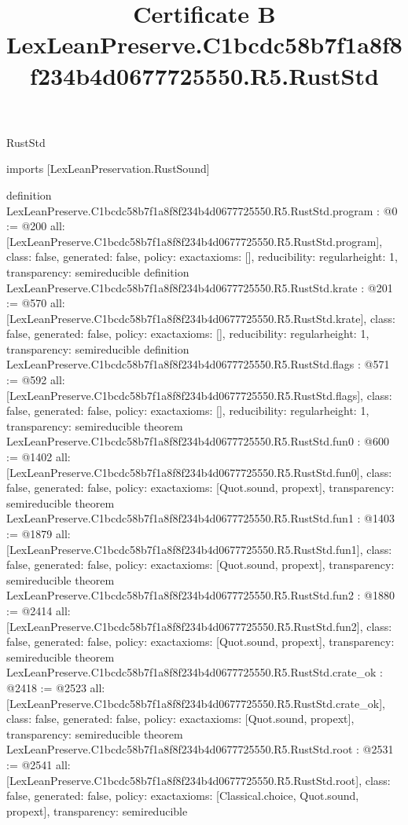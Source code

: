\begin{lexlean}{RustStd}
\title{Certificate B LexLeanPreserve.C1bcdc58b7f1a8f8f234b4d0677725550.R5.RustStd}
\begin{coremodule}
imports [LexLeanPreservation.RustSound]

definition LexLeanPreserve.C1bcdc58b7f1a8f8f234b4d0677725550.R5.RustStd.program : @0 := @200 {
  all: [LexLeanPreserve.C1bcdc58b7f1a8f8f234b4d0677725550.R5.RustStd.program],
  class: false,
  generated: false,
  policy: exact{axioms: []},
  reducibility: regular{height: 1},
  transparency: semireducible
}
definition LexLeanPreserve.C1bcdc58b7f1a8f8f234b4d0677725550.R5.RustStd.krate : @201 := @570 {
  all: [LexLeanPreserve.C1bcdc58b7f1a8f8f234b4d0677725550.R5.RustStd.krate],
  class: false,
  generated: false,
  policy: exact{axioms: []},
  reducibility: regular{height: 1},
  transparency: semireducible
}
definition LexLeanPreserve.C1bcdc58b7f1a8f8f234b4d0677725550.R5.RustStd.flags : @571 := @592 {
  all: [LexLeanPreserve.C1bcdc58b7f1a8f8f234b4d0677725550.R5.RustStd.flags],
  class: false,
  generated: false,
  policy: exact{axioms: []},
  reducibility: regular{height: 1},
  transparency: semireducible
}
theorem LexLeanPreserve.C1bcdc58b7f1a8f8f234b4d0677725550.R5.RustStd.fun0 : @600 := @1402 {
  all: [LexLeanPreserve.C1bcdc58b7f1a8f8f234b4d0677725550.R5.RustStd.fun0],
  class: false,
  generated: false,
  policy: exact{axioms: [Quot.sound, propext]},
  transparency: semireducible
}
theorem LexLeanPreserve.C1bcdc58b7f1a8f8f234b4d0677725550.R5.RustStd.fun1 : @1403 := @1879 {
  all: [LexLeanPreserve.C1bcdc58b7f1a8f8f234b4d0677725550.R5.RustStd.fun1],
  class: false,
  generated: false,
  policy: exact{axioms: [Quot.sound, propext]},
  transparency: semireducible
}
theorem LexLeanPreserve.C1bcdc58b7f1a8f8f234b4d0677725550.R5.RustStd.fun2 : @1880 := @2414 {
  all: [LexLeanPreserve.C1bcdc58b7f1a8f8f234b4d0677725550.R5.RustStd.fun2],
  class: false,
  generated: false,
  policy: exact{axioms: [Quot.sound, propext]},
  transparency: semireducible
}
theorem LexLeanPreserve.C1bcdc58b7f1a8f8f234b4d0677725550.R5.RustStd.crate_ok : @2418 := @2523 {
  all: [LexLeanPreserve.C1bcdc58b7f1a8f8f234b4d0677725550.R5.RustStd.crate_ok],
  class: false,
  generated: false,
  policy: exact{axioms: [Quot.sound, propext]},
  transparency: semireducible
}
theorem LexLeanPreserve.C1bcdc58b7f1a8f8f234b4d0677725550.R5.RustStd.root : @2531 := @2541 {
  all: [LexLeanPreserve.C1bcdc58b7f1a8f8f234b4d0677725550.R5.RustStd.root],
  class: false,
  generated: false,
  policy: exact{axioms: [Classical.choice, Quot.sound, propext]},
  transparency: semireducible
}


\end{coremodule}
\end{lexlean}
